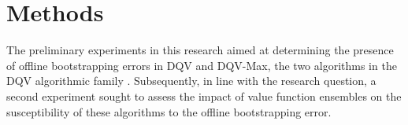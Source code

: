 \section{Methods}\label{sec:methods}
The preliminary experiments in this research aimed at determining the
presence of offline bootstrapping errors in DQV and DQV-Max, the two
algorithms in the DQV algorithmic family \citep{sabatelli2020deep}.
Subsequently, in line with the research question, a second experiment
sought to assess the impact of value function ensembles on the
susceptibility of these algorithms to the offline bootstrapping
error.

